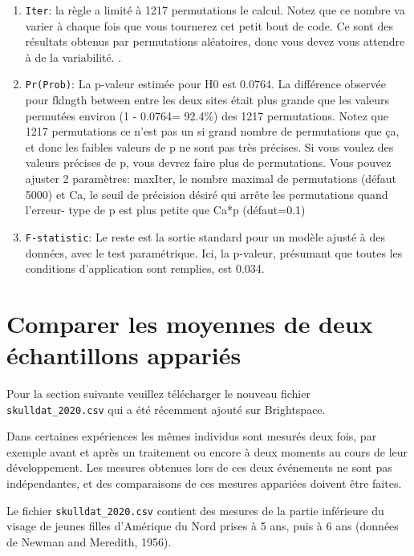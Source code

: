 \documentclass[
  12pt,
]{book}
\makeatletter
\providecommand{\tightlist}{%
  \setlength{\itemsep}{0pt}\setlength{\parskip}{0pt}}
\newenvironment{kframe}{%
\medskip{}
\setlength{\fboxsep}{.8em}
\def\at@end@of@kframe{}%
\ifinner\ifhmode%
 \def\at@end@of@kframe{\end{minipage}}%
 \begin{minipage}{\columnwidth}%
\fi\fi%
\def\FrameCommand##1{\hskip\@totalleftmargin \hskip-\fboxsep
\colorbox{incolor}{##1}\hskip-\fboxsep
    \hskip-\linewidth \hskip-\@totalleftmargin \hskip\columnwidth}%
\MakeFramed {\advance\hsize-\width
  \@totalleftmargin\z@ \linewidth\hsize
  \@setminipage}}%
{\par\unskip\endMakeFramed%
\at@end@of@kframe}
\newenvironment{rmdblock}[1]
 {
 \begin{itemize}
 \renewcommand{\labelitemi}{
   \raisebox{-.7\height}[0pt][0pt]{
     {\setkeys{Gin}{width=3em,keepaspectratio}\texttt{[image: images/\#1]}}
   }
 }
 \begin{kframe}
 \setlength{\fboxsep}{1em}
 \item
 }
 {
 \end{kframe}
 \end{itemize}
 }
\newenvironment{rmdwarning}
  {\begin{rmdblock}{warning}}
  {\end{rmdblock}}
\makeatother
\begin{document}
\begin{enumerate}
\def\labelenumi{\arabic{enumi}.}
\tightlist
\item
  \texttt{Iter}: la règle a limité à 1217 permutations le calcul. Notez que ce nombre va varier à chaque fois que vous tournerez cet petit bout de code. Ce sont des résultats obtenus par permutations aléatoires, donc vous devez vous attendre à de la variabilité. .
\item
  \texttt{Pr(Prob)}: La p-valeur estimée pour H0 est 0.0764. La différence observée pour fklngth between entre les deux sites était plus grande que les valeurs permutées environ (1 - 0.0764= 92.4\%) des 1217 permutations. Notez que 1217 permutations ce n'est pas un si grand nombre de permutations que ça, et donc les faibles valeurs de p ne sont pas très précises. Si vous voulez des valeurs précises de p, vous devrez faire plus de permutations. Vous pouvez ajuster 2 paramètres: maxIter, le nombre maximal de permutations (défaut 5000) et Ca, le seuil de précision désiré qui arrête les permutations quand l'erreur- type de p est plus petite que Ca*p (défaut=0.1)
\item
  \texttt{F-statistic}: Le reste est la sortie standard pour un modèle ajusté à des données, avec le test paramétrique. Ici, la p-valeur, présumant que toutes les conditions d'application sont remplies, est 0.034.
\end{enumerate}

\hypertarget{comparer-les-moyennes-de-deux-uxe9chantillons-appariuxe9s}{%
\section{Comparer les moyennes de deux échantillons appariés}\label{comparer-les-moyennes-de-deux-uxe9chantillons-appariuxe9s}}

\begin{rmdwarning}
Pour la section suivante veuillez télécharger le nouveau fichier \texttt{skulldat\_2020.csv} qui a été récemment ajouté sur Brightspace.
\end{rmdwarning}

Dans certaines expériences les mêmes individus sont mesurés deux fois, par exemple avant et après un traitement ou encore à deux moments au cours de leur développement. Les mesures obtenues lors de ces deux événements ne sont pas indépendantes, et des comparaisons de ces mesures appariées doivent être faites.

Le fichier \texttt{skulldat\_2020.csv} contient des mesures de la partie inférieure du visage de jeunes filles d'Amérique du Nord prises à 5 ans, puis à 6 ans (données de Newman and Meredith, 1956).
\end{document}
